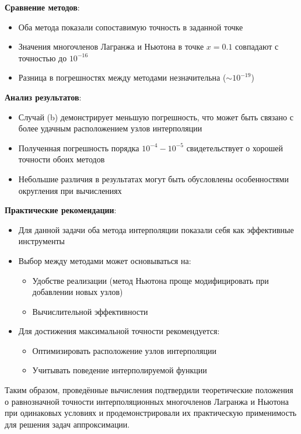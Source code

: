 \textbf{Сравнение методов}:
\begin{itemize}
\item Оба метода показали сопоставимую точность в заданной точке
\item Значения многочленов Лагранжа и Ньютона в точке $x=0.1$ совпадают с точностью до $10^{-16}$
\item Разница в погрешностях между методами незначительна ($\sim 10^{-19}$)
\end{itemize}

\textbf{Анализ результатов}:
\begin{itemize}
\item Случай (b) демонстрирует меньшую погрешность, что может быть связано с более удачным расположением узлов интерполяции
\item Полученная погрешность порядка $10^{-4}-10^{-5}$ свидетельствует о хорошей точности обоих методов
\item Небольшие различия в результатах могут быть обусловлены особенностями округления при вычислениях
\end{itemize}

\textbf{Практические рекомендации}:
\begin{itemize}
\item Для данной задачи оба метода интерполяции показали себя как эффективные инструменты
\item Выбор между методами может основываться на:
\begin{itemize}
\item Удобстве реализации (метод Ньютона проще модифицировать при добавлении новых узлов)
\item Вычислительной эффективности
\end{itemize}
\item Для достижения максимальной точности рекомендуется:
\begin{itemize}
\item Оптимизировать расположение узлов интерполяции
\item Учитывать поведение интерполируемой функции
\end{itemize}
\end{itemize}

Таким образом, проведённые вычисления подтвердили теоретические положения о равнозначной точности интерполяционных многочленов 
Лагранжа и Ньютона при одинаковых условиях и продемонстрировали их практическую применимость для решения задач аппроксимации.

\pagebreak
